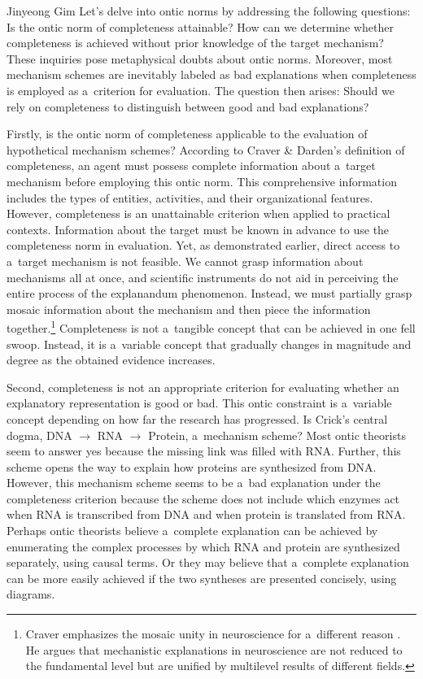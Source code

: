 \begin{artengenv}{Jinyeong Gim}
Let's delve into ontic norms by addressing the following questions: Is the ontic norm of completeness attainable? How can we determine whether completeness is achieved without prior knowledge of the target mechanism? These inquiries pose metaphysical doubts about ontic norms. Moreover, most mechanism schemes are inevitably labeled as bad explanations when completeness is employed as a~criterion for evaluation. The question then arises: Should we rely on completeness to distinguish between good and bad explanations?

Firstly, is the ontic norm of completeness applicable to the evaluation of hypothetical mechanism schemes? According to Craver \& Darden's definition of completeness, an agent must possess complete information about a~target mechanism before employing this ontic norm. This comprehensive information includes the types of entities, activities, and their organizational features. However, completeness is an unattainable criterion when applied to practical contexts. Information about the target must be known in advance to use the completeness norm in evaluation. Yet, as demonstrated earlier, direct access to a~target mechanism is not feasible. We cannot grasp information about mechanisms all at once, and scientific instruments do not aid in perceiving the entire process of the explanandum phenomenon. Instead, we must partially grasp mosaic information about the mechanism and then piece the information together.\footnote{Craver emphasizes the mosaic unity in neuroscience for a~different reason
\parencite[see][]{craver_explaining_2007}. %
 He argues that mechanistic explanations in neuroscience are not reduced to the fundamental level but are unified by multilevel results of different fields.} Completeness is not a~tangible concept that can be achieved in one fell swoop. Instead, it is a~variable concept that gradually changes in magnitude and degree as the obtained evidence increases.

Second, completeness is not an appropriate criterion for evaluating whether an explanatory representation is good or bad. This ontic constraint is a~variable concept depending on how far the research has progressed. Is Crick's central dogma, DNA $\to$ RNA $\to$ Protein, a~mechanism scheme? Most ontic theorists seem to answer yes because the missing link was filled with RNA. Further, this scheme opens the way to explain how proteins are synthesized from DNA. However, this mechanism scheme seems to be a~bad explanation under the completeness criterion because the scheme does not include which enzymes act when RNA is transcribed from DNA and when protein is translated from RNA. Perhaps ontic theorists believe a~complete explanation can be achieved by enumerating the complex processes by which RNA and protein are synthesized separately, using causal terms. Or they may believe that a~complete explanation can be more easily achieved if the two syntheses are presented concisely, using diagrams.


\end{artengenv}
